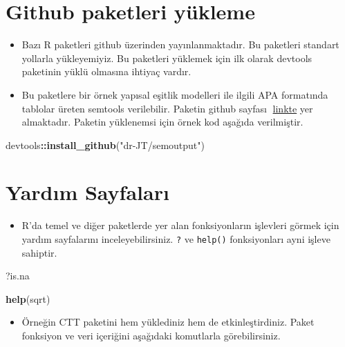 \documentclass[
  oneside]{book}
\newenvironment{Shaded}{\begin{snugshade}}{\end{snugshade}}
\newcommand{\FunctionTok}[1]{\textcolor[rgb]{0.13,0.29,0.53}{\textbf{#1}}}
\newcommand{\NormalTok}[1]{#1}
\newcommand{\SpecialCharTok}[1]{\textcolor[rgb]{0.81,0.36,0.00}{\textbf{#1}}}
\newcommand{\StringTok}[1]{\textcolor[rgb]{0.31,0.60,0.02}{#1}}
\providecommand{\tightlist}{%
  \setlength{\itemsep}{0pt}\setlength{\parskip}{0pt}}
\begin{document}
\hypertarget{github-paketleri-yuxfckleme}{%
\section{Github paketleri yükleme}\label{github-paketleri-yuxfckleme}}

\begin{itemize}
\item
  Bazı R paketleri github üzerinden yayınlanmaktadır. Bu paketleri standart yollarla yükleyemiyiz. Bu paketleri yüklemek için ilk olarak devtools paketinin yüklü olmasına ihtiyaç vardır.
\item
  Bu paketlere bir örnek yapısal eşitlik modelleri ile ilgili APA formatında tablolar üreten semtools verilebilir. Paketin github sayfası 🔗\href{https://github.com/dr-JT/semoutput}{linkte} yer almaktadır. Paketin yüklenemsi için örnek kod aşağıda verilmiştir.
\end{itemize}

\begin{Shaded}
\begin{Highlighting}[]
\NormalTok{devtools}\SpecialCharTok{::}\FunctionTok{install\_github}\NormalTok{(}\StringTok{"dr{-}JT/semoutput"}\NormalTok{)}
\end{Highlighting}
\end{Shaded}

\hypertarget{yardux131m-sayfalarux131}{%
\section{Yardım Sayfaları}\label{yardux131m-sayfalarux131}}

\begin{itemize}
\tightlist
\item
  R'da temel ve diğer paketlerde yer alan fonksiyonların işlevleri görmek için yardım sayfalarını inceleyebilirsiniz. \texttt{?} ve \texttt{help()} fonksiyonları ayni işleve sahiptir.
\end{itemize}

\begin{Shaded}
\begin{Highlighting}[]
\NormalTok{?is.na}

\FunctionTok{help}\NormalTok{(sqrt)}
\end{Highlighting}
\end{Shaded}

\begin{itemize}
\tightlist
\item
  Örneğin CTT paketini hem yüklediniz hem de etkinleştirdiniz. Paket fonksiyon ve veri içeriğini aşağıdaki komutlarla görebilirsiniz.
\end{itemize}
\end{document}
